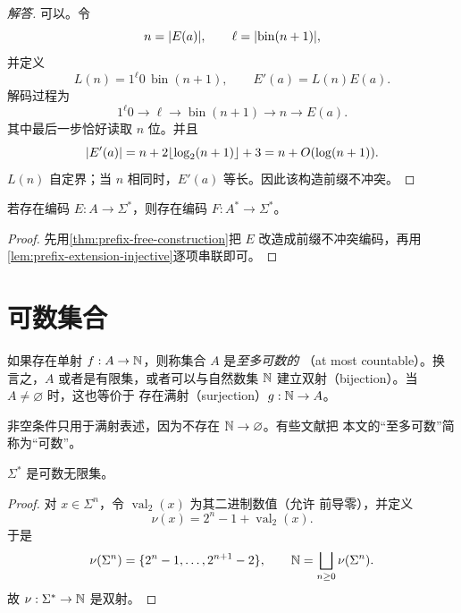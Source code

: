 \begin{proof}[解答]
  可以。令
  \[
    n=\lvert E(a)\rvert,\qquad
    \ell=\lvert \operatorname{bin}(n+1)\rvert,
  \]
  并定义
  \[
    L(n)=1^{\ell}0\,\operatorname{bin}(n+1),
    \qquad
    E'(a)=L(n)E(a).
  \]
  解码过程为
  \[
    1^{\ell}0
    \longrightarrow \ell
    \longrightarrow \operatorname{bin}(n+1)
    \longrightarrow n
    \longrightarrow E(a).
  \]
  其中最后一步恰好读取 $n$ 位。并且
  \[
    \lvert E'(a)\rvert
    =n+2\lfloor\log_2(n+1)\rfloor+3
    =n+O(\log(n+1)).
  \]
  $L(n)$ 自定界；当 $n$ 相同时，$E'(a)$ 等长。因此该构造前缀不冲突。
\end{proof}

\begin{corollary}
  \label{cor:sequence-encoding}
  若存在编码 $E:A\to\Sigma^*$，则存在编码
  $F:A^*\to\Sigma^*$。
\end{corollary}

\begin{proof}
  先用\cref{thm:prefix-free-construction}把 $E$ 改造成前缀不冲突编码，再用
  \cref{lem:prefix-extension-injective}逐项串联即可。
\end{proof}

\section{可数集合}

\begin{definition}[至多可数]
  \label{def:countable}
  如果存在单射 $f:A\to\mathbb{N}$，则称集合 $A$ 是\emph{至多可数的}
  （at most countable）。换言之，$A$ 或者是有限集，或者可以与自然数集
  $\mathbb{N}$ 建立双射（bijection）。当 $A\neq\varnothing$ 时，这也等价于
  存在满射（surjection）$g:\mathbb{N}\to A$。
\end{definition}

\begin{remark}
  非空条件只用于满射表述，因为不存在 $\mathbb{N}\to\varnothing$。有些文献把
  本文的“至多可数”简称为“可数”。
\end{remark}

\begin{lemma}
  \label{lem:binary-strings-countable}
  $\Sigma^*$ 是可数无限集。
\end{lemma}

\begin{proof}
  对 $x\in\Sigma^n$，令 $\operatorname{val}_2(x)$ 为其二进制数值（允许
  前导零），并定义
  \[
    \nu(x)=2^n-1+\operatorname{val}_2(x).
  \]
  于是
  \[
    \nu(\Sigma^n)=\{2^n-1,\ldots,2^{n+1}-2\},
    \qquad
    \mathbb{N}=\bigsqcup_{n\geq0}\nu(\Sigma^n).
  \]
  故 $\nu:\Sigma^*\to\mathbb{N}$ 是双射。
\end{proof}

